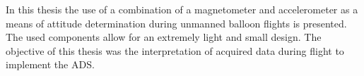 In this thesis the use of a combination of a magnetometer and accelerometer as a means of attitude determination during unmanned balloon flights is presented. The used components allow for an extremely light and small design. The objective of this thesis was the interpretation of acquired data during flight to implement the \acf{ADS}.